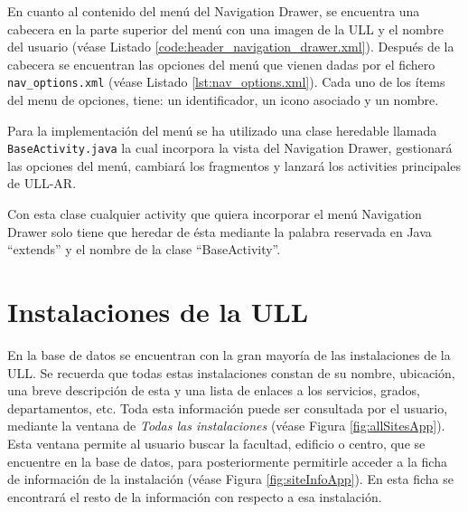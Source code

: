 

En cuanto al contenido del menú del Navigation Drawer, se encuentra una cabecera en la parte superior del menú con una imagen de la ULL y el nombre del usuario (véase Listado \ref{code:header_navigation_drawer.xml}). Después de la cabecera se encuentran las opciones del menú que vienen dadas por el fichero \texttt{nav\_options.xml} (véase Listado \ref{lst:nav_options.xml}). Cada uno de los ítems del menu de opciones, tiene: un identificador, un icono asociado y un nombre.


   
\bigskip



Para la implementación del menú se ha utilizado una clase heredable llamada \texttt{BaseActivity.java} la cual incorpora la vista del Navigation Drawer, gestionará las opciones del menú, cambiará los fragmentos y lanzará los activities principales de ULL-AR. 



Con esta clase cualquier activity que quiera incorporar el menú Navigation Drawer  solo tiene que heredar de ésta mediante la palabra reservada en Java ``extends'' y el nombre de la clase ``BaseActivity''.

        
\section{Instalaciones de la ULL}

En la base de datos se encuentran con la gran mayoría de las instalaciones de la ULL. Se recuerda que todas estas instalaciones constan de su nombre, ubicación, una breve descripción de esta y una lista de enlaces a los servicios, grados, departamentos, etc. Toda esta información puede ser consultada por el usuario, mediante la ventana de \textit{Todas las instalaciones} (véase Figura \ref{fig:allSitesApp}). Esta ventana permite al usuario buscar la facultad, edificio o centro, que se encuentre en la base de datos, para posteriormente permitirle acceder a la ficha de información de la instalación (véase Figura \ref{fig:siteInfoApp}). En esta ficha se encontrará el resto de la información con respecto a esa instalación.

